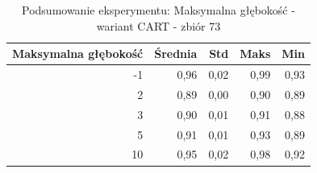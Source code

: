 \begin{table}[htbp]
\centering
\small
\setlength{\tabcolsep}{6pt}
\renewcommand{\arraystretch}{1.2}
\caption{Podsumowanie eksperymentu: Maksymalna głębokość - wariant CART - zbiór 73}
\label{tab:CART_max_depth_73}
\begin{tabular}{r|r|r|r|r}
\toprule
Maksymalna głębokość & Średnia & Std & Maks & Min \\
\hline
-1 & 0,96 & 0,02 & 0,99 & 0,93 \\
2 & 0,89 & 0,00 & 0,90 & 0,89 \\
3 & 0,90 & 0,01 & 0,91 & 0,88 \\
5 & 0,91 & 0,01 & 0,93 & 0,89 \\
10 & 0,95 & 0,02 & 0,98 & 0,92 \\
\bottomrule
\end{tabular}
\end{table}